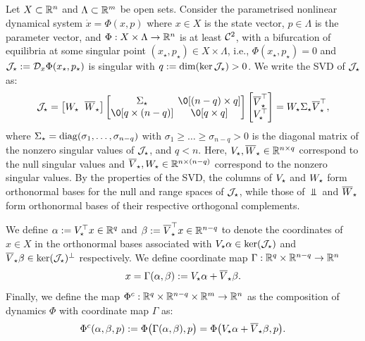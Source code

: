 \documentclass[a4paper]{cas-dc}
\begin{document}
\subsection{\LSR{}}
\label{ssec:lsr}

Let \(X \subset \R[n]\) and \(\Lambda \subset \R[m]\) be open sets. Consider the parametrised nonlinear dynamical system \(\dot{x} = \Phi(x,p)\) where \(x \in X\) is the state vector, \(p \in \Lambda\) is the parameter vector, and \(\Phi : X \times \Lambda \to \R[n]\) is at least \(\C[2]\), with a bifurcation of equilibria at some singular point \((x_{\star},p_{\star}) \in X \times \Lambda\), i.e., \(\Phi(x_{\star},p_{\star}) = 0\) and \(\J := \D[x]\Phi(x_{\star},p_{\star})\) is singular with \(q := \dim(\ker\J) > 0\). We write the SVD of \(\J\) as:
\begin{equation}
    \J = \begin{bmatrix}\W \hspace{2mm} \Wbar\end{bmatrix} \begin{bmatrix} \s &\hspace{-2mm} \0[(n-q) \times q] \\ \0[q \times (n-q)] &\hspace{-2mm} \0[q \times q]\end{bmatrix} \begin{bmatrix}\Vbar^{\top} \\ \V^{\top}\end{bmatrix} = \W\s\Vbar^{\top}, \label{eq:SVD}
\end{equation}
where \(\s = \diag(\sigma_{1},\dots,\sigma_{n-q})\) with \(\sigma_{1} \ge \dots \ge \sigma_{n-q} > 0\) is the diagonal matrix of the nonzero singular values of \(\J\), and \(q < n\). Here, \(\V, \Wbar \in \R[n \times q]\) correspond to the null singular values and \(\Vbar, \W \in \R[n \times (n-q)]\) correspond to the nonzero singular values. By the properties of the SVD, the columns of \(\V\) and \(\W\) form orthonormal bases for the null and range spaces of \(\J\), while those of \(\Vbar\) and \(\Wbar\) form orthonormal bases of their respective orthogonal complements.

We define \(\A := \V^{\top}x \in \R[q]\) and \(\B := \Vbar^{\top}x \in \R[n-q]\) to denote the coordinates of \(x \in X\) in the orthonormal bases associated with \(\V\A \in \ker(\J)\) and \(\Vbar\B \in \ker(\J)^{\perp}\) respectively. We define coordinate map \(\Gamma : \R[q] \times \R[n-q] \to \R[n]\)
\begin{equation}
    x = \Gamma(\A,\B) := \V\A + \Vbar\B. \label{def:Gamma}
\end{equation}
Finally, we define the map \(\Phi^{c} : \R[q] \times \R[n-q] \times \R[m] \to \R[n]\) as the composition of dynamics \(\Phi\) with coordinate map \(\Gamma\) as:
\begin{equation*}
    \Phi^{c}(\A,\B,p) := \Phi\bigl(\Gamma(\A,\B),p\bigr) = \Phi\bigl(\V\A+\Vbar\B,p\bigr).
\end{equation*}
\end{document}
